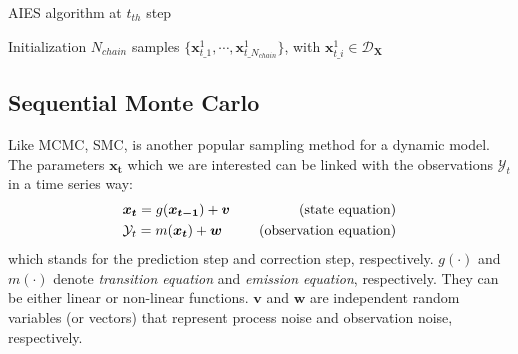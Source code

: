\begin{algorithm}    
    \caption{\acrlong{AIES} algorithm at $t_{th}$ step}
    \label{Algorithm:AIES}
    Initialization $N_{chain}$ samples $\{  \boldsymbol{x}_{t\_1}^{1},\cdots,\boldsymbol{x}_{t\_{N_{chain}}}^{1}\}$, with $\boldsymbol{x}_{t\_i}^{1} \in \mathcal{D}_{\boldsymbol{X}}$\
    
\end{algorithm}



\subsection{Sequential Monte Carlo}

Like \acrshort{MCMC}, \acrfull{SMC}, is another popular sampling method for a dynamic model. The parameters $\boldsymbol{{x}_{t}}$ which we are interested can be linked with the observations $\mathcal{Y}_{t}$ in a time series way:
\begin{equation}
\label{eq: Bayesian filtering}
\begin{aligned}
   & \boldsymbol{{x}_{t}}  =g(\boldsymbol{{x}_{t-1}}) + \boldsymbol{v} \ \   \ &\rm{(state  \ equation)}\\    
     &\mathcal{Y}_{t}=m(\boldsymbol{{x}_{t}}) + \boldsymbol{w} \ \ \ \ \ &\rm{(observation \  equation)}
\end{aligned}
\end{equation}
which stands for the prediction step and correction step, respectively.
$g(\cdot)$ and $m(\cdot)$ denote \textit{transition equation} and \textit{emission equation}, respectively. They can be either linear or non-linear functions. $\boldsymbol{v}$ and $\boldsymbol{w}$ are independent random variables (or vectors) that represent process noise and observation noise, respectively.


